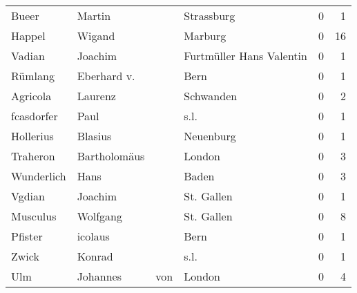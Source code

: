 \begin{tabular}{llllrr}
                    Bueer &                             Martin &             &                                  Strassburg &          0 &         1 \\
                   Happel &                             Wigand &             &                                     Marburg &          0 &        16 \\
                   Vadian &                            Joachim &             &                    Furtmüller Hans Valentin &          0 &         1 \\
                  Rümlang &                        Eberhard v. &             &                                        Bern &          0 &         1 \\
                 Agricola &                            Laurenz &             &                                   Schwanden &          0 &         2 \\
               fcasdorfer &                               Paul &             &                                        s.l. &          0 &         1 \\
                Hollerius &                            Blasius &             &                                   Neuenburg &          0 &         1 \\
                 Traheron &                       Bartholomäus &             &                                      London &          0 &         3 \\
               Wunderlich &                               Hans &             &                                       Baden &          0 &         3 \\
                   Vgdian &                            Joachim &             &                                  St. Gallen &          0 &         1 \\
                 Musculus &                           Wolfgang &             &                                  St. Gallen &          0 &         8 \\
                  Pfister &                            icolaus &             &                                        Bern &          0 &         1 \\
                    Zwick &                             Konrad &             &                                        s.l. &          0 &         1 \\
                      Ulm &                           Johannes &         von &                                      London &          0 &         4 \\

\end{tabular}
